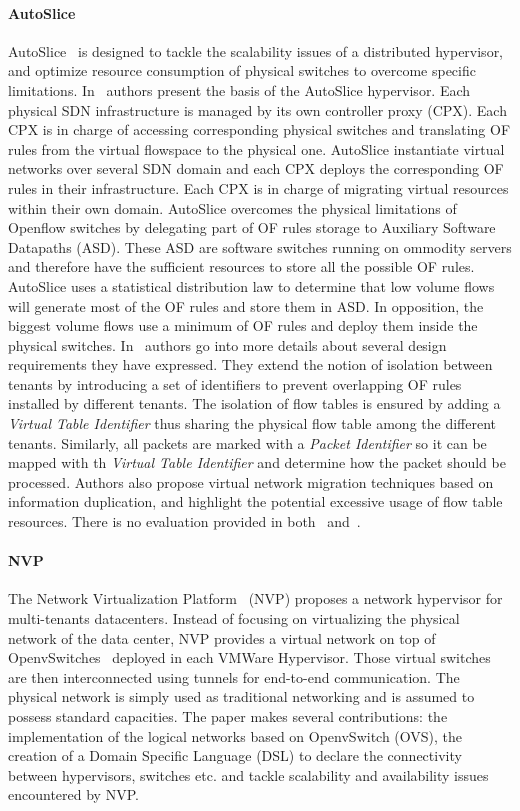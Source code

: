 \paragraph{AutoSlice}
AutoSlice~\cite{AutoSlice-Bozakov2012} is designed to tackle the scalability issues of a distributed hypervisor, and optimize resource consumption of physical switches to overcome specific limitations.
In~\cite{AutoSlice-Bozakov2012} authors present the basis of the AutoSlice hypervisor.
Each physical SDN infrastructure is managed by its own controller proxy (CPX).
Each CPX is in charge of accessing corresponding physical switches and translating OF rules from the virtual flowspace to the physical one.
AutoSlice instantiate virtual networks over several SDN domain and each CPX deploys the corresponding OF rules in their infrastructure.
Each CPX is in charge of migrating virtual resources within their own domain.
AutoSlice overcomes the physical limitations of Openflow switches by delegating part of OF rules storage to Auxiliary Software Datapaths (ASD).
These ASD are software switches running on ommodity servers and therefore have the sufficient resources to store all the possible OF rules.
AutoSlice uses a statistical distribution law to determine that low volume flows will generate most of the OF rules and store them in ASD. In opposition, the biggest volume flows use a minimum of OF rules and deploy them inside the physical switches.
In~\cite{AutoSlice2-Bozakov2014} authors go into more details about several design requirements they have expressed. They extend the notion of isolation between tenants by introducing a set of identifiers to prevent overlapping OF rules installed by different tenants.
The isolation of flow tables is ensured by adding a \textit{Virtual Table Identifier} thus sharing the physical flow table among the different tenants.
Similarly, all packets are marked with a \textit{Packet Identifier} so it can be mapped with th \textit{Virtual Table Identifier} and determine how the packet should be processed.
Authors also propose virtual network migration techniques based on information duplication, and highlight the potential excessive usage of flow table resources.
There is no evaluation provided in both~\cite{AutoSlice-Bozakov2012} and~\cite{AutoSlice2-Bozakov2014}.

\paragraph{NVP}
The Network Virtualization Platform~\cite{NVP-Koponen2014} (NVP) proposes a network hypervisor for multi-tenants datacenters. Instead of focusing on virtualizing the physical network of the data center, NVP provides a virtual network on top of OpenvSwitches~\cite{openvswitch} deployed in each VMWare Hypervisor. Those virtual switches are then interconnected using tunnels for end-to-end communication. The physical network is simply used as traditional networking and is assumed to possess standard capacities.
The paper makes several contributions: the implementation of the logical networks based on OpenvSwitch (OVS), the creation of a Domain Specific Language (DSL) to declare the connectivity between hypervisors, switches etc. and tackle scalability and availability issues encountered by NVP.

